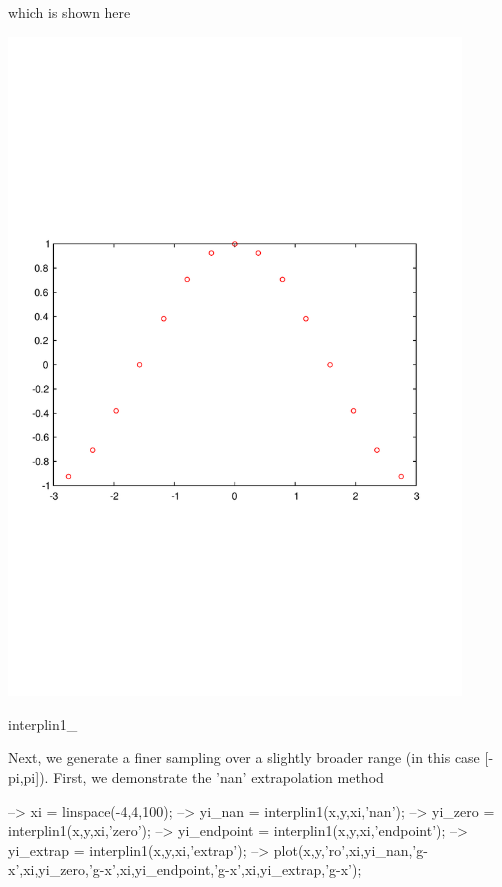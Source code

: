 which is shown here  
\begin{DoxyImage}
\includegraphics[width=12cm]{interplin1_1}
\caption{interplin1\-\_}
\end{DoxyImage}
 Next, we generate a finer sampling over a slightly broader range (in this case {\ttfamily \mbox{[}-\/pi,pi\mbox{]}}). First, we demonstrate the {\ttfamily 'nan'} extrapolation method


\begin{DoxyVerbInclude}
--> xi = linspace(-4,4,100);
--> yi_nan = interplin1(x,y,xi,'nan');
--> yi_zero = interplin1(x,y,xi,'zero');
--> yi_endpoint = interplin1(x,y,xi,'endpoint');
--> yi_extrap = interplin1(x,y,xi,'extrap');
--> plot(x,y,'ro',xi,yi_nan,'g-x',xi,yi_zero,'g-x',xi,yi_endpoint,'g-x',xi,yi_extrap,'g-x');
\end{DoxyVerbInclude}


